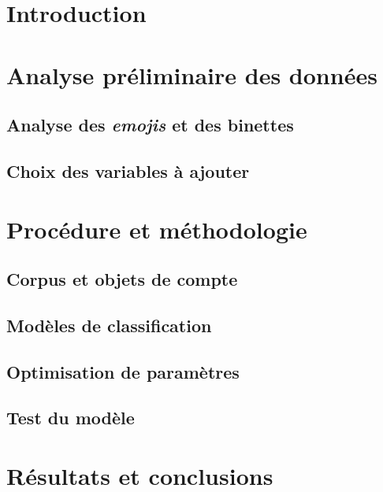 \documentclass{article}
\numberwithin{equation}{section}
\begin{document}

\newpage
\tableofcontents
\newpage

\section{Introduction}



\section{Analyse préliminaire des données}
\subsection{Analyse des \emph{emojis} et des binettes}


\subsection{Choix des variables à ajouter}



\section{Procédure et méthodologie}


\subsection{Corpus et objets de compte}


\subsection{Modèles de classification}


\subsection{Optimisation de paramètres}


\subsection{Test du modèle}



\section{Résultats et conclusions}
\end{document}
